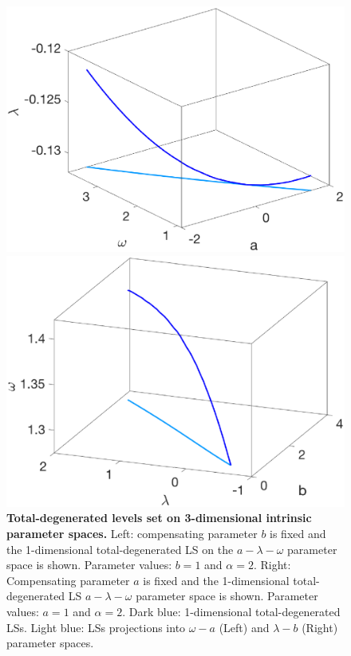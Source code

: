   \begin{figure}[h]
  \centering
        \begin{minipage}{0.45\linewidth}
            \begin{center}
                \includegraphics[width=1\linewidth]{Images/photo16_1.eps}
            \end{center}
        \end{minipage} 
        \begin{minipage}{0.45\linewidth}
            \begin{center}
                \includegraphics[width=1\linewidth]{Images/photo16_2.eps}
            \end{center}
        \end{minipage} 
  
  \caption{\textbf{Total-degenerated levels set on 3-dimensional intrinsic parameter spaces.} Left: compensating parameter $b$ is fixed and the 1-dimensional total-degenerated LS on the $a-\lambda-\omega$ parameter space is shown. Parameter values: $b=1$ and $\alpha=2$. Right: Compensating parameter $a$ is fixed and the 1-dimensional total-degenerated LS $a-\lambda-\omega$ parameter space is shown. Parameter values: $a=1$ and $\alpha=2$. Dark blue: 1-dimensional total-degenerated LSs. Light blue: LSs projections into $\omega-a$ (Left) and $\lambda-b$ (Right) parameter spaces.}
  \label{photo16}
\end{figure}

